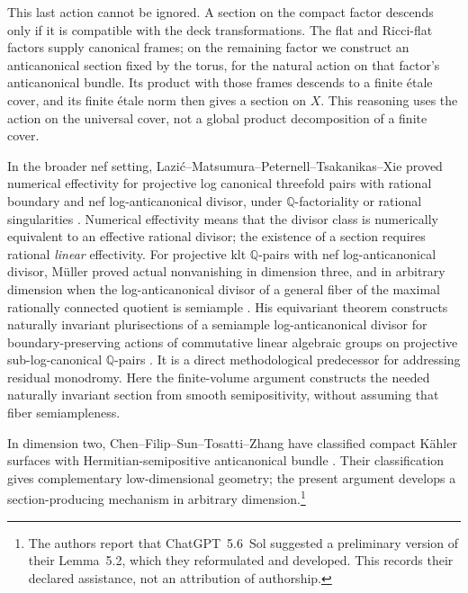 This last action cannot be ignored. A section on the compact factor
descends only if it is compatible with the deck transformations.
The flat and Ricci-flat factors supply canonical frames; on the remaining
factor we construct an anticanonical section fixed by the torus, for the
natural action on that factor's anticanonical bundle. Its product with those frames descends
to a finite \'etale cover, and its finite \'etale norm then
gives a section on \(X\). This reasoning uses the action on the universal
cover, not a global product decomposition of a finite cover.

In the broader nef setting,
Lazi\'c--Matsumura--Peternell--Tsakanikas--Xie proved numerical effectivity
for projective log canonical threefold pairs with rational boundary
and nef log-anticanonical divisor, under
\(\mathbb Q\)-factoriality or rational singularities
\cite[Theorem~A]{LMPTX2023}. Numerical effectivity means that the divisor
class is numerically equivalent to an effective rational divisor;
the existence of a section requires rational \emph{linear} effectivity.
For projective klt \(\mathbb Q\)-pairs with nef log-anticanonical
divisor, M\"uller proved actual nonvanishing in dimension three,
and in arbitrary dimension when the log-anticanonical divisor of a
general fiber of the maximal rationally connected quotient is semiample
\cite[Theorem~A and Corollary~B]{Muller2025}.
His equivariant theorem constructs naturally invariant plurisections
of a semiample log-anticanonical divisor for boundary-preserving actions
of commutative linear algebraic groups on projective sub-log-canonical
\(\mathbb Q\)-pairs
\cite[Theorem~C]{Muller2025}. It is a direct methodological predecessor
for addressing residual monodromy. Here the finite-volume argument
constructs the needed naturally invariant section from smooth
semipositivity, without assuming that fiber semiampleness.

In dimension two, Chen--Filip--Sun--Tosatti--Zhang have classified
compact K\"ahler surfaces with Hermitian-semipositive anticanonical bundle
\cite[Theorem~1.3]{CFSTZ2026}.
Their classification gives complementary low-dimensional geometry;
the present argument develops a section-producing mechanism in arbitrary
dimension.\footnote{The authors report that ChatGPT~5.6~Sol suggested
a preliminary version of their Lemma~5.2, which they reformulated and
developed. This records their declared assistance, not an attribution
of authorship.}

